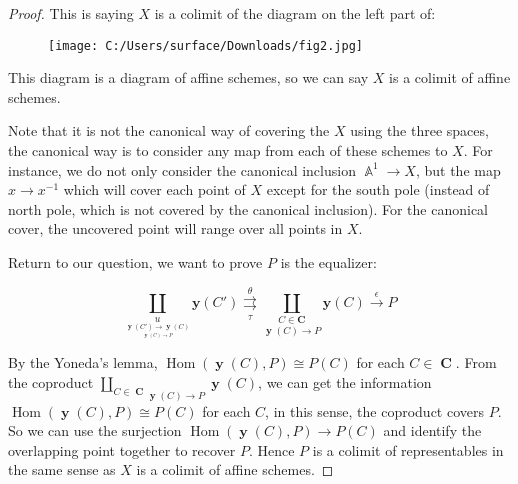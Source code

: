 \documentclass[a4paper]{article}
\DeclareMathOperator{\C}{\mathbf {C}}
\DeclareMathOperator{\y}{\mathbf y}
\DeclareMathOperator{\Hom}{\text {Hom}}
\DeclareMathOperator{\An}{\mathbb A}
\begin{document}
\begin{proof}
       This is saying $X$ is a colimit of the diagram on the left part of:

       \begin{figure}[ht]
        \centering
        \texttt{[image: C:/Users/surface/Downloads/fig2.jpg]}
       \end{figure}
    



       This diagram is a diagram of affine schemes, so we can say $X$ is a colimit of affine schemes. 
       
       
       Note that it is not the canonical way of covering the $X$ using the three spaces, the canonical way is to consider any map from each of these schemes to $X$. For instance, we do not only consider the canonical inclusion $\An^1\to X$, but the map $x\to x^{-1}$ which will cover each point of $X$ except for the south pole (instead of north pole, which is not covered by the canonical inclusion). For the canonical cover, the uncovered point will range over all points in $X$.



       Return to our question, we want to prove $P$ is the equalizer:

       $$\underset{\underset{\underset{\y(C)\to P}{\y(C')\to \y(C)}}u}\coprod \mathbf y (C')\overset{\theta}{\underset{\tau}\rightrightarrows}\underset{\y(C)\to P}{\underset{C\in \mathbf C}\coprod}{\mathbf y(C)}\overset{\epsilon}\to P$$

       By the Yoneda's lemma, $\Hom(\y(C),P)\cong P(C)$ for each $C\in \C$. From the coproduct $\underset{\y(C)\to P}{\underset{C\in \C}\coprod}\y(C)$, we can get the information $\Hom(\y(C),P)\cong P(C)$ for each $C$, in this sense, the coproduct covers $P$. So we can use the surjection $\Hom(\y(C),P)\to P(C)$ and identify the overlapping point together to recover $P$. Hence $P$ is a colimit of representables in the same sense as $X$ is a colimit of affine schemes.

       







      
       
    
   \end{proof}
\end{document}
